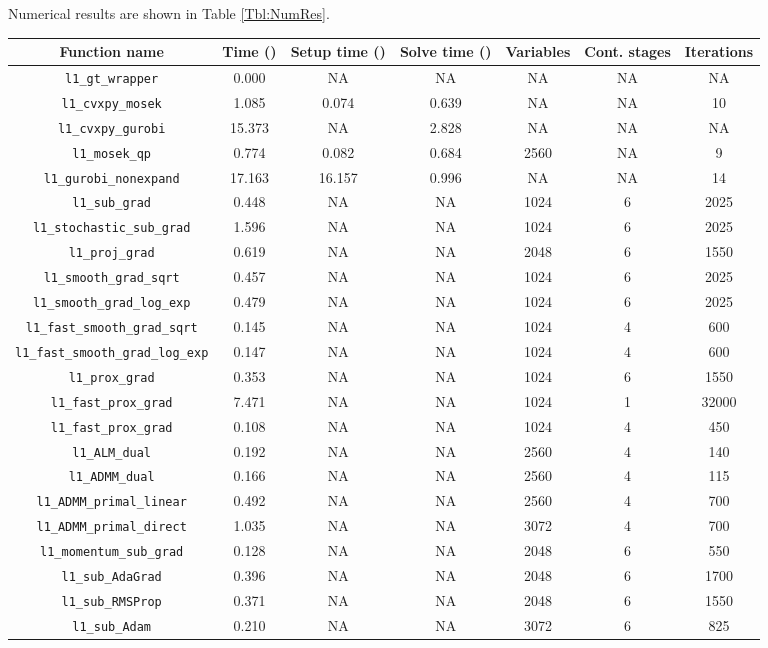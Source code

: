 \documentclass[english]{pkupaper}
\begin{document}
Numerical results are shown in Table \ref{Tbl:NumRes}.

\begin{table}[htbp]
\footnotesize
\centering
\begin{tabular}{|c|c|c|c|c|c|c|}
\hline
Function name & Time (\Si{\second}) & Setup time (\Si{\second}) & Solve time (\Si{\second}) & Variables & Cont. stages & Iterations \\ \hline
\verb"l1_gt_wrapper" & 0.000 & NA & NA & NA & NA & NA \\ \hline
\verb"l1_cvxpy_mosek" & 1.085 & 0.074 & 0.639 & NA & NA & 10 \\ \hline
\verb"l1_cvxpy_gurobi" & 15.373 & NA & 2.828 & NA & NA & NA \\ \hline
\verb"l1_mosek_qp" & 0.774 & 0.082 & 0.684 & 2560 & NA & 9 \\ \hline
\verb"l1_gurobi_nonexpand" & 17.163 & 16.157 & 0.996 & NA & NA & 14 \\ \hline
\verb"l1_sub_grad" & 0.448 & NA & NA & 1024 & 6 & 2025 \\ \hline
\verb"l1_stochastic_sub_grad" & 1.596 & NA & NA & 1024 & 6 & 2025 \\ \hline
\verb"l1_proj_grad" & 0.619 & NA & NA & 2048 & 6 & 1550 \\ \hline
\verb"l1_smooth_grad_sqrt" & 0.457 & NA & NA & 1024 & 6 & 2025 \\ \hline
\verb"l1_smooth_grad_log_exp" & 0.479 & NA & NA & 1024 & 6 & 2025 \\ \hline
\verb"l1_fast_smooth_grad_sqrt" & 0.145 & NA & NA & 1024 & 4 & 600 \\ \hline
\verb"l1_fast_smooth_grad_log_exp" & 0.147 & NA & NA & 1024 & 4 & 600 \\ \hline
\verb"l1_prox_grad" & 0.353 & NA & NA & 1024 & 6 & 1550 \\ \hline
\verb"l1_fast_prox_grad" & 7.471 & NA & NA & 1024 & 1 & 32000 \\ \hline
\verb"l1_fast_prox_grad" & 0.108 & NA & NA & 1024 & 4 & 450 \\ \hline
\verb"l1_ALM_dual" & 0.192 & NA & NA & 2560 & 4 & 140 \\ \hline
\verb"l1_ADMM_dual" & 0.166 & NA & NA & 2560 & 4 & 115 \\ \hline
\verb"l1_ADMM_primal_linear" & 0.492 & NA & NA & 2560 & 4 & 700 \\ \hline
\verb"l1_ADMM_primal_direct" & 1.035 & NA & NA & 3072 & 4 & 700 \\ \hline
\verb"l1_momentum_sub_grad" & 0.128 & NA & NA & 2048 & 6 & 550 \\ \hline
\verb"l1_sub_AdaGrad" & 0.396 & NA & NA & 2048 & 6 & 1700 \\ \hline
\verb"l1_sub_RMSProp" & 0.371 & NA & NA & 2048 & 6 & 1550 \\ \hline
\verb"l1_sub_Adam" & 0.210 & NA & NA & 3072 & 6 & 825 \\ \hline
\end{tabular}


\end{table}
\end{document}
